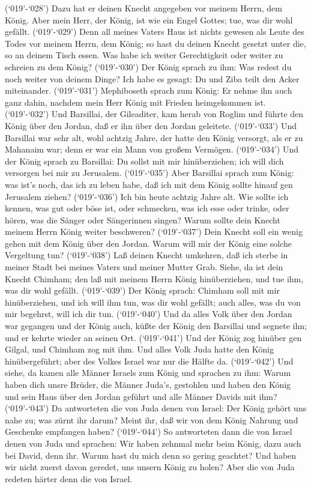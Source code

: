  (`019'-`028') Dazu hat er deinen Knecht angegeben vor
meinem Herrn, dem König. Aber mein Herr, der König, ist wie ein Engel
Gottes; tue, was dir wohl gefällt.  (`019'-`029') Denn all
meines Vaters Haus ist nichts gewesen als Leute des Todes vor meinem
Herrn, dem König; so hast du deinen Knecht gesetzt unter die, so an
deinem Tisch essen. Was habe ich weiter Gerechtigkeit oder weiter zu
schreien zu dem König?  (`019'-`030') Der König sprach zu
ihm: Was redest du noch weiter von deinem Dinge? Ich habe es gesagt: Du
und Ziba teilt den Acker miteinander.  (`019'-`031')
Mephiboseth sprach zum König: Er nehme ihn auch ganz dahin, nachdem mein
Herr König mit Frieden heimgekommen ist.  (`019'-`032') Und
Barsillai, der Gileaditer, kam herab von Roglim und führte den König
über den Jordan, daß er ihn über den Jordan geleitete. 
(`019'-`033') Und Barsillai war sehr alt, wohl achtzig Jahre, der hatte
den König versorgt, als er zu Mahanaim war; denn er war ein Mann von
großem Vermögen.  (`019'-`034') Und der König sprach zu
Barsillai: Du sollst mit mir hinüberziehen; ich will dich versorgen bei
mir zu Jerusalem.  (`019'-`035') Aber Barsillai sprach zum
König: was ist's noch, das ich zu leben habe, daß ich mit dem König
sollte hinauf gen Jerusalem ziehen?  (`019'-`036') Ich bin
heute achtzig Jahre alt. Wie sollte ich kennen, was gut oder böse ist,
oder schmecken, was ich esse oder trinke, oder hören, was die Sänger
oder Sängerinnen singen? Warum sollte dein Knecht meinem Herrn König
weiter beschweren?  (`019'-`037') Dein Knecht soll ein
wenig gehen mit dem König über den Jordan. Warum will mir der König eine
solche Vergeltung tun?  (`019'-`038') Laß deinen Knecht
umkehren, daß ich sterbe in meiner Stadt bei meines Vaters und meiner
Mutter Grab. Siehe, da ist dein Knecht Chimham; den laß mit meinem Herrn
König hinüberziehen, und tue ihm, was dir wohl gefällt. 
(`019'-`039') Der König sprach: Chimham soll mit mir hinüberziehen, und
ich will ihm tun, was dir wohl gefällt; auch alles, was du von mir
begehrst, will ich dir tun.  (`019'-`040') Und da alles
Volk über den Jordan war gegangen und der König auch, küßte der König
den Barsillai und segnete ihn; und er kehrte wieder an seinen Ort.
 (`019'-`041') Und der König zog hinüber gen Gilgal, und
Chimham zog mit ihm. Und alles Volk Juda hatte den König hinübergeführt;
aber des Volkes Israel war nur die Hälfte da. 
(`019'-`042') Und siehe, da kamen alle Männer Israels zum König und
sprachen zu ihm: Warum haben dich unsre Brüder, die Männer Juda's,
gestohlen und haben den König und sein Haus über den Jordan geführt und
alle Männer Davids mit ihm?  (`019'-`043') Da antworteten
die von Juda denen von Israel: Der König gehört uns nahe zu; was zürnt
ihr darum? Meint ihr, daß wir von dem König Nahrung und Geschenke
empfangen haben?  (`019'-`044') So antworteten dann die von
Israel denen von Juda und sprachen: Wir haben zehnmal mehr beim König,
dazu auch bei David, denn ihr. Warum hast du mich denn so gering
geachtet? Und haben wir nicht zuerst davon geredet, uns unsern König zu
holen? Aber die von Juda redeten härter denn die von Israel.

